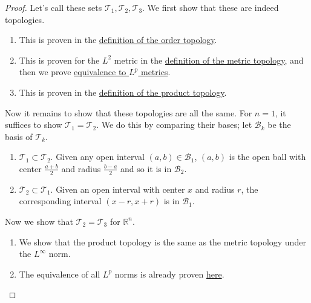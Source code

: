   \begin{proof} 
    Let's call these sets $\mathscr{T}_1, \mathscr{T}_2, \mathscr{T}_3$. We first show that these are indeed topologies. 
    \begin{enumerate}
      \item This is proven in the \hyperref[pst-def:order-topology]{definition of the order topology}. 
      \item This is proven for the $L^2$ metric in the \hyperref[pst-def:metric-topology]{definition of the metric topology}, and then we prove \hyperref[pst-thm:lp-norms-euclidean-topology]{equivalence to $L^p$ metrics}. 
      \item This is proven in the \hyperref[pst-def:product-topology]{definition of the product topology}. 
    \end{enumerate}

    Now it remains to show that these topologies are all the same. For $n=1$, it suffices to show $\mathscr{T}_1 = \mathscr{T}_2$. We do this by comparing their bases; let $\mathscr{B}_k$ be the basis of $\mathscr{T}_k$. 
    \begin{enumerate}
      \item $\mathscr{T}_1 \subset \mathscr{T}_2$. Given any open interval $(a, b) \in \mathscr{B}_1$, $(a, b)$ is the open ball with center $\frac{a + b}{2}$ and radius $\frac{b - a}{2}$ and so it is in $\mathscr{B}_2$. 
      \item $\mathscr{T}_2 \subset \mathscr{T}_1$. Given an open interval with center $x$ and radius $r$, the corresponding interval $(x - r, x + r)$ is in $\mathscr{B}_1$. 
    \end{enumerate}
    Now we show that $\mathscr{T}_2 = \mathscr{T}_3$ for $\mathbb{R}^n$. 
    \begin{enumerate}
      \item We show that the product topology is the same as the metric topology under the $L^\infty$ norm. 
      \item The equivalence of all $L^p$ norms is already proven \hyperref[pst-thm:lp-norms-euclidean-topology]{here}. 
    \end{enumerate}
  \end{proof}

